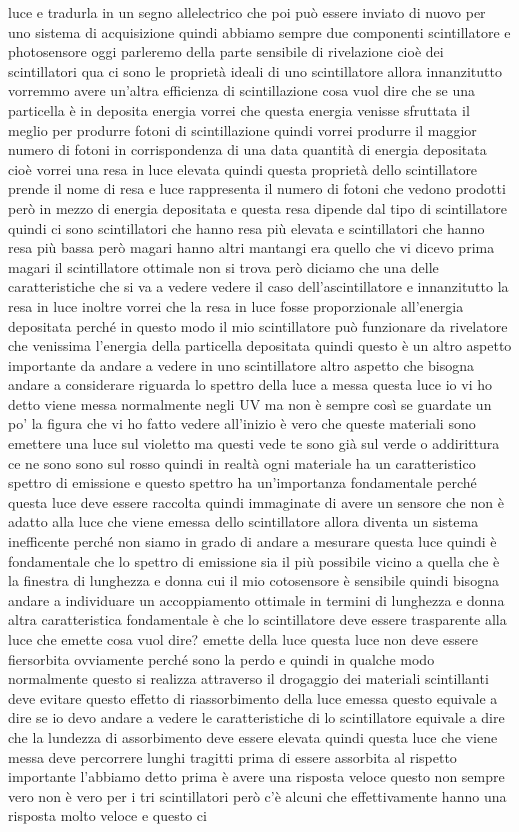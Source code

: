 luce e tradurla in un segno allelectrico che poi può essere inviato di nuovo per uno sistema di acquisizione quindi abbiamo sempre due componenti scintillatore e photosensore oggi parleremo della parte sensibile di rivelazione cioè dei scintillatori qua ci sono le proprietà ideali di uno scintillatore allora innanzitutto vorremmo avere un'altra efficienza di scintillazione cosa vuol dire che se una particella è in deposita energia vorrei che questa energia venisse sfruttata il meglio per produrre fotoni di scintillazione quindi vorrei produrre il maggior numero di fotoni in corrispondenza di una data quantità di energia depositata cioè vorrei una resa in luce elevata quindi questa proprietà dello scintillatore prende il nome di resa e luce rappresenta il numero di fotoni che vedono prodotti però in mezzo di energia depositata e questa resa dipende dal tipo di scintillatore quindi ci sono scintillatori che hanno resa più elevata e scintillatori che hanno resa più bassa però magari hanno altri mantangi era quello che vi dicevo prima magari il scintillatore ottimale non si trova però diciamo che una delle caratteristiche che si va a vedere vedere il caso dell'ascintillatore e innanzitutto la resa in luce inoltre vorrei che la resa in luce fosse proporzionale all'energia depositata perché in questo modo il mio scintillatore può funzionare da rivelatore che venissima l'energia della particella depositata quindi questo è un altro aspetto importante da andare a vedere in uno scintillatore altro aspetto che bisogna andare a considerare riguarda lo spettro della luce a messa questa luce io vi ho detto viene messa normalmente negli UV ma non è sempre così se guardate un po' la figura che vi ho fatto vedere all'inizio è vero che queste materiali sono emettere una luce sul violetto ma questi vede te sono già sul verde o addirittura ce ne sono sono sul rosso quindi in realtà ogni materiale ha un caratteristico spettro di emissione e questo spettro ha un'importanza fondamentale perché questa luce deve essere raccolta quindi immaginate di avere un sensore che non è adatto alla luce che viene emessa dello scintillatore allora diventa un sistema inefficente perché non siamo in grado di andare a mesurare questa luce quindi è fondamentale che lo spettro di emissione sia il più possibile vicino a quella che è la finestra di lunghezza e donna cui il mio cotosensore è sensibile quindi bisogna andare a individuare un accoppiamento ottimale in termini di lunghezza e donna altra caratteristica fondamentale è che lo scintillatore deve essere trasparente alla luce che emette cosa vuol dire? emette della luce questa luce non deve essere fiersorbita ovviamente perché sono la perdo e quindi in qualche modo normalmente questo si realizza attraverso il drogaggio dei materiali scintillanti deve evitare questo effetto di riassorbimento della luce emessa questo equivale a dire se io devo andare a vedere le caratteristiche di lo scintillatore equivale a dire che la lundezza di assorbimento deve essere elevata quindi questa luce che viene messa deve percorrere lunghi tragitti prima di essere assorbita al rispetto importante l'abbiamo detto prima è avere una risposta veloce questo non sempre vero non è vero per i tri scintillatori però c'è alcuni che effettivamente hanno una risposta molto veloce e questo ci 